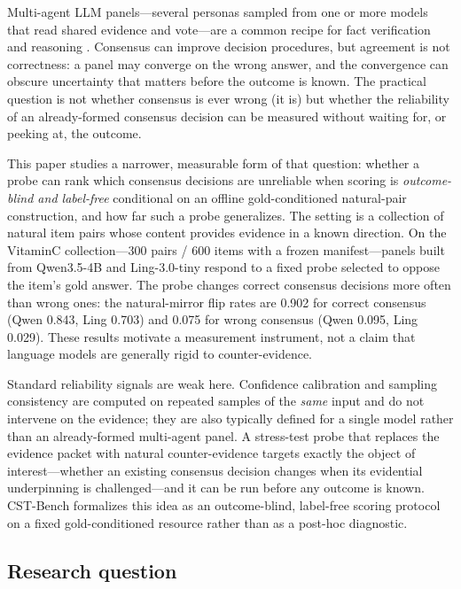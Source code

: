 \documentclass[11pt]{article}
\begin{document}
Multi-agent LLM panels---several personas sampled from one or more models that read shared evidence and vote---are a common recipe for fact verification and reasoning \citep{du-etal-2024-multiagent-debate}. Consensus can improve decision procedures, but agreement is not correctness: a panel may converge on the wrong answer, and the convergence can obscure uncertainty that matters before the outcome is known. The practical question is not whether consensus is ever wrong (it is) but whether the reliability of an already-formed consensus decision can be measured without waiting for, or peeking at, the outcome.

This paper studies a narrower, measurable form of that question: whether a probe can rank which consensus decisions are unreliable when scoring is \emph{outcome-blind and label-free} conditional on an offline gold-conditioned natural-pair construction, and how far such a probe generalizes. The setting is a collection of natural item pairs whose content provides evidence in a known direction. On the VitaminC collection---300 pairs / 600 items with a frozen manifest---panels built from Qwen3.5-4B and Ling-3.0-tiny respond to a fixed probe selected to oppose the item's gold answer. The probe changes correct consensus decisions more often than wrong ones: the natural-mirror flip rates are 0.902 for correct consensus (Qwen 0.843, Ling 0.703) and 0.075 for wrong consensus (Qwen 0.095, Ling 0.029). These results motivate a measurement instrument, not a claim that language models are generally rigid to counter-evidence.

Standard reliability signals are weak here. Confidence calibration and sampling consistency are computed on repeated samples of the \emph{same} input and do not intervene on the evidence; they are also typically defined for a single model rather than an already-formed multi-agent panel. A stress-test probe that replaces the evidence packet with natural counter-evidence targets exactly the object of interest---whether an existing consensus decision changes when its evidential underpinning is challenged---and it can be run before any outcome is known. CST-Bench formalizes this idea as an outcome-blind, label-free scoring protocol on a fixed gold-conditioned resource rather than as a post-hoc diagnostic.

\subsection{Research question}
\end{document}
